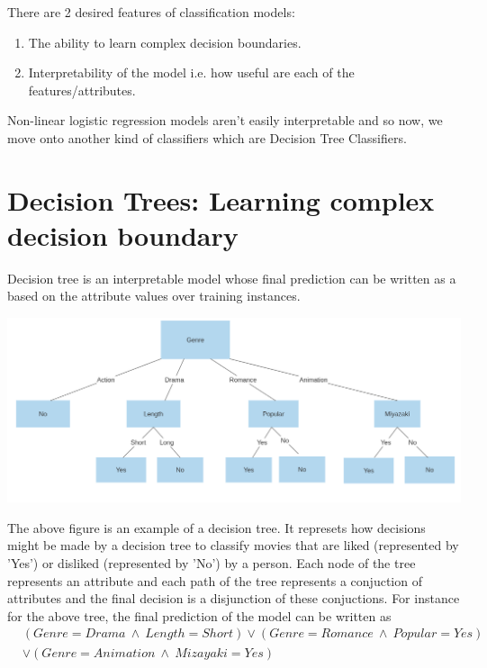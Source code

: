 There are 2 desired features of classification models:
\begin{enumerate}
  \item The ability to learn complex decision boundaries.
  \item Interpretability of the model i.e. how useful are each of the features/attributes.
\end{enumerate}

Non-linear logistic regression models aren't easily interpretable and so now, we move onto another kind of classifiers which are Decision Tree Classifiers.

\section{Decision Trees: Learning complex decision boundary}
Decision tree is an interpretable model whose final prediction can be written as a  based on the attribute values over training instances.

\begin{center}
  \includegraphics[width=\textwidth]{images/05_06.png}
\end{center}

The above figure is an example of a decision tree. It represets how decisions might be made by a decision tree to classify movies that are liked (represented by 'Yes') or disliked (represented by 'No') by a person. Each node of the tree represents an attribute and each path of the tree represents a conjuction of attributes and the final decision is a disjunction of these conjuctions. For instance for the above tree, the final prediction of the model can be written as
\begin{align*}
   & (Genre = Drama \ \wedge \ Length = Short) \vee (Genre = Romance \ \wedge \ Popular = Yes) \\
   & \vee (Genre = Animation \ \wedge \ Mizayaki = Yes)
\end{align*}

